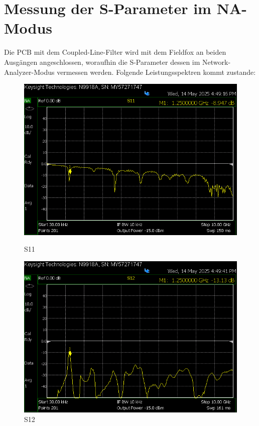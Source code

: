 \section{Messung der S-Parameter im NA-Modus}
Die PCB mit dem Coupled-Line-Filter wird mit dem Fieldfox an beiden Ausgängen angeschlossen, 
    woraufhin die S-Parameter dessen im Network-Analyzer-Modus vermessen werden. Folgende Leistungsspektren kommt zustande:
    \begin{figure}[H]
        
        \begin{minipage}{0.45\textwidth}
            \centering
            \includegraphics[width=\linewidth]{Pictures/S11neuCooleGrupp.png}
            \caption*{S11}
        \end{minipage}
        \hfill
        \begin{minipage}{0.45\textwidth}
            \centering
            \includegraphics[width=\linewidth]{Pictures/S12neuCooleGrupp.png}
            \caption*{S12}
        \end{minipage}


\end{figure}
